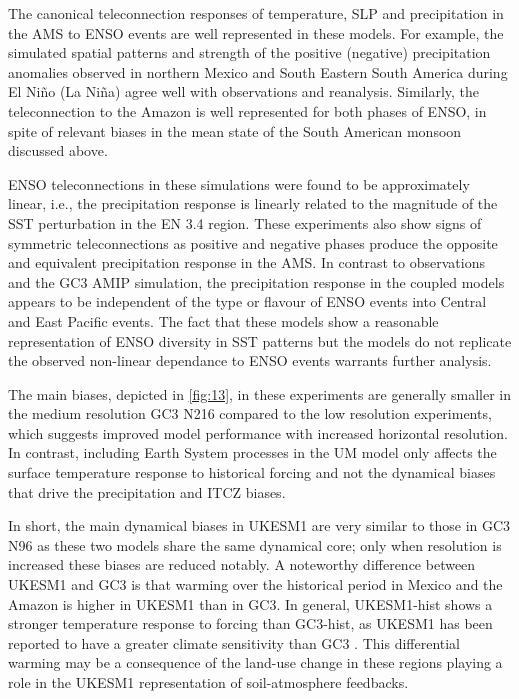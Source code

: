   
The canonical teleconnection responses  of  temperature, SLP and precipitation in the AMS to ENSO events are well represented in these models. For example, the simulated spatial patterns and strength of the positive (negative) precipitation anomalies observed in northern Mexico and South Eastern South America during El Ni\~no (La Ni\~na) agree well with observations and reanalysis.
 Similarly, the teleconnection to the Amazon is well represented for both phases of ENSO, in spite of relevant biases in the mean state of the South American monsoon discussed above. %
 
ENSO teleconnections in these simulations were found to be approximately linear, i.e., the precipitation response is linearly related to the magnitude of the SST perturbation in the EN 3.4 region. These experiments also show signs of symmetric teleconnections as positive and negative phases produce the opposite and equivalent precipitation response in the AMS. In contrast to observations and the GC3 AMIP simulation, the precipitation response in the coupled models appears to be independent of the type or flavour of ENSO events into Central and East Pacific events. The fact that these models show a reasonable representation of ENSO diversity in SST patterns but the models  do not replicate the observed non-linear dependance to ENSO events warrants further analysis.


The main biases, depicted in \ref{fig:13}, in these experiments are generally smaller in the medium resolution GC3 N216 compared to the low resolution experiments, which suggests improved model performance with increased horizontal resolution.
In contrast, including Earth System processes in the UM model only affects the surface temperature response to historical forcing and not the dynamical biases that drive the precipitation and ITCZ biases. 

In short, the main dynamical biases in UKESM1 are very similar to those in GC3 N96 as these two models  share the same dynamical core; only when resolution is increased these biases are reduced notably. A noteworthy difference between UKESM1 and GC3 is that warming over the historical period in Mexico and the Amazon is higher in UKESM1 than in GC3. In general, UKESM1-hist shows a stronger temperature response to forcing than GC3-hist, as UKESM1 has been reported to have a  greater climate sensitivity than GC3 \citep{andrews2019,sellar2019}.  This differential warming may be a consequence of the land-use change in these regions playing a role in the UKESM1 representation of soil-atmosphere feedbacks. %


